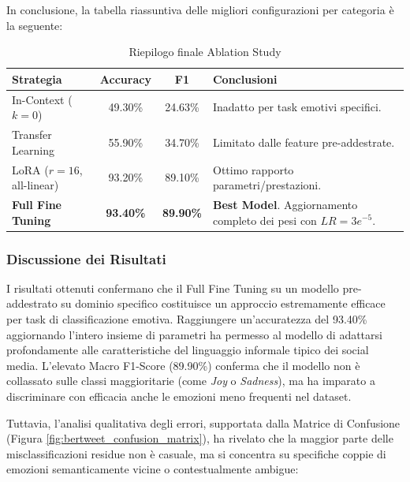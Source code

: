 \documentclass[a4paper,12pt]{article}
\begin{document}
In conclusione, la tabella riassuntiva delle migliori configurazioni per categoria è la seguente:

\begin{table}[H]
    \centering
    \renewcommand{\arraystretch}{1.3}
    \begin{tabular}{|l|c|c|p{8cm}|}
        \hline
        \textbf{Strategia}        & \textbf{Accuracy} & \textbf{F1}      & \textbf{Conclusioni}                                                     \\
        \hline
        In-Context ($k=0$)        & 49.30\%           & 24.63\%          & Inadatto per task emotivi specifici.                                     \\
        \hline
        Transfer Learning         & 55.90\%           & 34.70\%          & Limitato dalle feature pre-addestrate.                                   \\
        \hline
        LoRA ($r=16$, all-linear) & 93.20\%           & 89.10\%          & Ottimo rapporto parametri/prestazioni.                                   \\
        \hline
        \textbf{Full Fine Tuning} & \textbf{93.40\%}  & \textbf{89.90\%} & \textbf{Best Model}. Aggiornamento completo dei pesi con $LR = 3e^{-5}$. \\
        \hline
    \end{tabular}
    \caption{Riepilogo finale Ablation Study}
    \label{tab:final_summary}
\end{table}

\subsubsection{Discussione dei Risultati}
I risultati ottenuti confermano che il Full Fine Tuning su un modello pre-addestrato su dominio specifico
costituisce un approccio estremamente efficace per task di classificazione emotiva.
Raggiungere un'accuratezza del 93.40\% aggiornando l'intero insieme di parametri ha permesso al modello
di adattarsi profondamente alle caratteristiche del linguaggio informale tipico dei social media.
L'elevato Macro F1-Score (89.90\%) conferma che il modello non è collassato sulle classi maggioritarie
(come \textit{Joy} o \textit{Sadness}), ma ha imparato a discriminare con efficacia anche le emozioni
meno frequenti nel dataset.

Tuttavia, l'analisi qualitativa degli errori, supportata dalla Matrice di Confusione (Figura \ref{fig:bertweet_confusion_matrix}), ha rivelato che la maggior parte delle misclassificazioni residue non è casuale, ma si concentra su specifiche coppie di emozioni semanticamente vicine o contestualmente ambigue:
\end{document}
